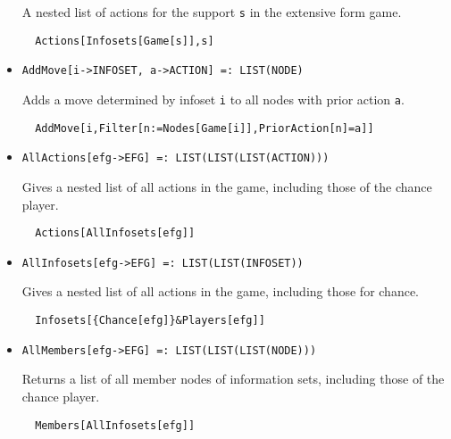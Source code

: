 \begin{itemize}
\bd 

A nested list of actions for the support \verb+s+ in the extensive
form game.

\begin{verbatim}
  Actions[Infosets[Game[s]],s]
\end{verbatim} 
\ed

\item{}
\protect \large \begin{verbatim}
AddMove[i->INFOSET, a->ACTION] =: LIST(NODE) 
\end{verbatim}\normalsize

\bd 
Adds a move determined by infoset \verb+i+ to all nodes with prior
action \verb+a+.  
\begin{verbatim}
  AddMove[i,Filter[n:=Nodes[Game[i]],PriorAction[n]=a]]
\end{verbatim} 
\ed

\item{}
\protect \large \begin{verbatim}
AllActions[efg->EFG] =: LIST(LIST(LIST(ACTION))) 
\end{verbatim}\normalsize

\bd 
Gives a nested list of all actions in the game, including those of
the chance player.  
\begin{verbatim}
  Actions[AllInfosets[efg]]
\end{verbatim} 
\ed

\item{}
\protect \large \begin{verbatim}
AllInfosets[efg->EFG] =: LIST(LIST(INFOSET)) 
\end{verbatim}\normalsize

\bd 
Gives a nested list of all actions in the game, including those for
chance. 
\begin{verbatim}
  Infosets[{Chance[efg]}&Players[efg]]
\end{verbatim} 
\ed

\item{}
\protect \large \begin{verbatim}
AllMembers[efg->EFG] =: LIST(LIST(LIST(NODE))) 
\end{verbatim}\normalsize

\bd 
Returns a list of all member nodes of information sets, including
those of the chance player.
\begin{verbatim}
  Members[AllInfosets[efg]]
\end{verbatim} 
\ed


\end{itemize}
